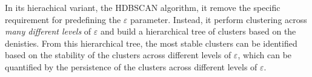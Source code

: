 In its hierachical variant, the HDBSCAN\cite{campello2015hierarchical} algorithm, it remove the specific requirement for predefining the $\varepsilon$ parameter. Instead, it perform clustering across \textit{many different levels} of $\varepsilon$ and build a hierarchical tree of clusters based on the denisties. From this hierarchical tree, the most stable clusters can be identified based on the stability of the clusters across different levels of $\varepsilon$, which can be quantified by the persistence of the clusters across different levels of $\varepsilon$. 

